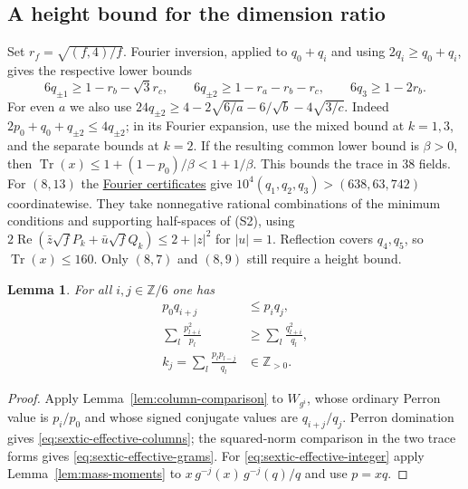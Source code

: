 \documentclass[11pt,reqno]{amsart}
\newcommand{\codecheck}[2]{\href{https://github.com/sebastienpalcoux/grothendieck-ring-classification/blob/d5750105bb5758f3ad38d2e5464dfcc12c019816/supplements/rank6/sphericality/#1}{#2}}
\newtheorem{lemma}[theorem]{Lemma}
\theoremstyle{remark}\newtheorem{remark}[theorem]{Remark}
\numberwithin{equation}{section}
\begin{document}
\subsection{A height bound for the dimension ratio}
Set $r_f=\sqrt{(f,4)/f}$. Fourier inversion, applied to $q_0+q_i$
and using $2q_i\ge q_0+q_i$, gives the respective lower bounds
\[
 6q_{\pm1}\ge1-r_b-\sqrt3r_c,\qquad
 6q_{\pm2}\ge1-r_a-r_b-r_c,\qquad 6q_3\ge1-2r_b .
\]
For even $a$ we also use
$24q_{\pm2}\ge4-2\sqrt{6/a}-6/\sqrt b-4\sqrt{3/c}$.
Indeed $2p_0+q_0+q_{\pm2}\le4q_{\pm2}$; in its Fourier expansion,
use the mixed bound at $k=1,3$, and the separate bounds at $k=2$.
If the resulting common lower bound is $\beta>0$, then
$\operatorname{Tr}(x)\le1+(1-p_0)/\beta<1+1/\beta$.
This bounds the trace in 38 fields. For $(8,13)$ the
\codecheck{sextic_complement/sextic_matrix_bound.py}{Fourier certificates}
give $10^4(q_1,q_2,q_3)>(638,63,742)$ coordinatewise. They take
nonnegative rational combinations of the minimum conditions and
supporting half-spaces of (S2), using
$2\operatorname{Re}(\bar z\sqrt f P_k+\bar u\sqrt f Q_k)\le2+|z|^2$
for $|u|=1$. Reflection covers $q_4,q_5$, so $\operatorname{Tr}(x)\le160$.
Only $(8,7)$ and $(8,9)$ still require a height bound.

\begin{lemma}\label{lem:sextic-two-column-moment}
For all $i,j\in\mathbb Z/6$ one has
\begin{align}
 p_0 q_{i+j}&\le p_i q_j,\label{eq:sextic-effective-columns}\\
 \sum_l \frac{p_{l+i}^2}{p_l}&\ge
 \sum_l\frac{q_{l+i}^2}{q_l},\label{eq:sextic-effective-grams}\\
 k_j=\sum_l\frac{p_l p_{l-j}}{q_l}&\in\mathbb Z_{>0}.
 \label{eq:sextic-effective-integer}
\end{align}
\end{lemma}
\begin{proof}
Apply Lemma~\ref{lem:column-comparison} to $W_{g^i}$, whose ordinary
Perron value is $p_i/p_0$ and whose signed conjugate values are
$q_{i+j}/q_j$. Perron domination gives \eqref{eq:sextic-effective-columns};
the squared-norm comparison in the two trace forms gives
\eqref{eq:sextic-effective-grams}. For \eqref{eq:sextic-effective-integer}
apply Lemma~\ref{lem:mass-moments} to
$x\,g^{-j}(x)\,g^{-j}(q)/q$ and use $p=xq$.
\end{proof}
\end{document}
